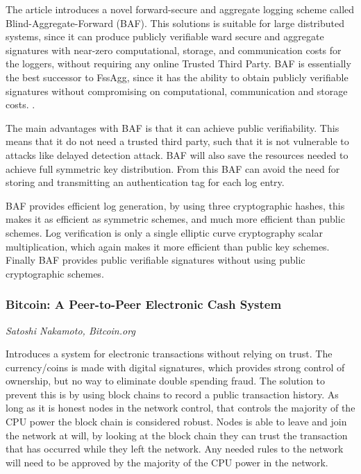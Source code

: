 The article introduces a novel forward-secure and aggregate logging
scheme called Blind-Aggregate-Forward (BAF). This solutions is
suitable for large distributed systems, since it can produce publicly
verifiable ward secure and aggregate signatures with near-zero
computational, storage, and communication costs for the loggers,
without requiring any online Trusted Third Party.  BAF is essentially
the best successor to FssAgg, since it has the ability to obtain publicly verifiable signatures without compromising on computational, communication and storage costs. .

The main advantages with BAF is that it can achieve public
verifiability. This means that it do not need a trusted third party,
such that it is not vulnerable to attacks like delayed detection
attack. BAF will also save the resources needed to achieve full
symmetric key distribution. From this BAF can avoid the need for
storing and transmitting an authentication tag for each log entry.

BAF provides efficient log generation, by using three cryptographic
hashes, this makes it as efficient as symmetric schemes, and much more
efficient than public schemes. Log verification is only a single
elliptic curve cryptography scalar multiplication, which again makes
it more efficient than public key schemes. Finally BAF provides public
verifiable signatures without using public cryptographic
schemes.~\cite{baf}

\subsubsection{Bitcoin: A Peer-to-Peer Electronic Cash System}
\vspace{-3mm}
{\footnotesize \it Satoshi Nakamoto, Bitcoin.org}~\cite{nakamoto}

Introduces a system for electronic transactions without relying on
trust. The currency/coins is made with digital signatures, which
provides strong control of ownership, but no way to eliminate double
spending fraud. The solution to prevent this is by using block chains
to record a public transaction history. As long as it is honest nodes
in the network control, that controls the majority of the CPU power
the block chain is considered robust. Nodes is able to leave and join
the network at will, by looking at the block chain they can trust the
transaction that has occurred while they left the network. Any needed
rules to the network will need to be approved by the majority of the
CPU power in the network.~\cite{nakamoto}
